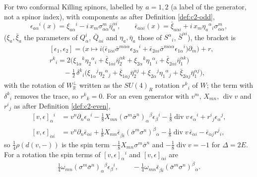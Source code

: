 \begin{remark}
For two conformal Killing spinors, labelled by $a=1,2$ (a label of the generator, not a spinor index), with components as after Definition \ref{def:c2-odd},
\[
\epsilon_{a\alpha}{}^i(x)=\xi_{a\alpha}{}^i-i\,x_m\sigma^m_{\alpha\dot\alpha}\bar\eta_a^{\dot\alpha i},\qquad \bar\epsilon_{a\dot\alpha i}(x)=\bar\xi_{a\dot\alpha i}+i\,x_m\eta_a{}^\alpha{}_i\sigma^m_{\alpha\dot\alpha},
\]
($\xi_a,\bar\xi_a$ the parameters of $Q^i_\alpha$, $\bar Q_{\dot\alpha i}$ and $\eta_a,\bar\eta_a$ those of $S^\alpha{}_i$, $\bar S^{\dot\alpha i}$), the bracket is
\[
\begin{aligned}
&[\epsilon_1,\epsilon_2]=\Big(x\mapsto i\big(\bar\epsilon_{1\dot\alpha i}\bar\sigma^{m\dot\alpha\alpha}\epsilon_{2\alpha}{}^i+\bar\epsilon_{2\dot\alpha i}\bar\sigma^{m\dot\alpha\alpha}\epsilon_{1\alpha}{}^i\big)\partial_m\Big)+r,\\
&r^k{}_i=2\big(\xi_{1\alpha}{}^k\eta_2{}^\alpha{}_i+\bar\xi_{1\dot\alpha i}\bar\eta_2^{\dot\alpha k}+\xi_{2\alpha}{}^k\eta_1{}^\alpha{}_i+\bar\xi_{2\dot\alpha i}\bar\eta_1^{\dot\alpha k}\big)\\
&\qquad-\tfrac12\,\delta^k{}_i\big(\xi_{1\alpha}{}^j\eta_2{}^\alpha{}_j+\bar\xi_{1\dot\alpha j}\bar\eta_2^{\dot\alpha j}+\xi_{2\alpha}{}^j\eta_1{}^\alpha{}_j+\bar\xi_{2\dot\alpha j}\bar\eta_1^{\dot\alpha j}\big),
\end{aligned}
\]
with the rotation of $W_{\mathbb R}^\perp$ written as the $SU(4)_R$ rotation $r^k{}_i$ of $W$; the term with $\delta^k{}_i$ removes the trace, so $r^k{}_k=0$. For an even generator with $v^m$, $X_{mn}$, $\operatorname{div}v$ and $r^i{}_j$ as after Definition \ref{def:c2-even},
\[
\begin{aligned}
[v,\epsilon]_\alpha{}^i&=v^n\partial_n\epsilon_\alpha{}^i-\tfrac18X_{mn}(\sigma^m\bar\sigma^n)_\alpha{}^\beta\epsilon_\beta{}^i-\tfrac18\operatorname{div}v\,\epsilon_\alpha{}^i+r^i{}_j\epsilon_\alpha{}^j,\\
[v,\epsilon]_{\dot\alpha i}&=v^n\partial_n\bar\epsilon_{\dot\alpha i}+\tfrac18X_{mn}\bar\epsilon_{\dot\beta i}(\bar\sigma^m\sigma^n)^{\dot\beta}{}_{\dot\alpha}-\tfrac18\operatorname{div}v\,\bar\epsilon_{\dot\alpha i}-\bar\epsilon_{\dot\alpha j}r^j{}_i ,
\end{aligned}
\]
so $\tfrac14\rho(d(v,-))$ is the spin term $-\tfrac18X_{mn}\sigma^m\bar\sigma^n$ and $-\tfrac18\operatorname{div}v=-1$ for $\Delta=2E$. For a rotation the spin terms of $[v,\epsilon]_\alpha{}^i$ and $[v,\epsilon]_{\dot\alpha i}$ are
\[
\tfrac14\omega_{mn}(\sigma^m\bar\sigma^n)_\alpha{}^\beta\epsilon_\beta{}^i,\qquad -\tfrac14\omega_{mn}\bar\epsilon_{\dot\beta i}(\bar\sigma^m\sigma^n)^{\dot\beta}{}_{\dot\alpha}.
\]
\end{remark}

